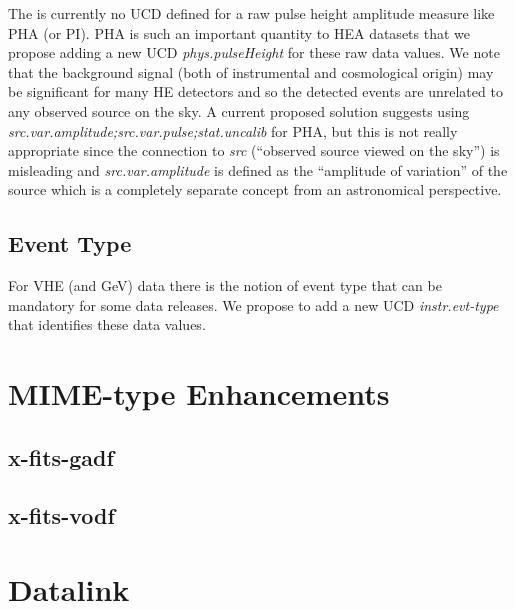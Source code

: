 \documentclass[11pt,a4paper]{ivoa}
\begin{document}
The is currently no UCD defined for a raw pulse height amplitude measure like PHA (or PI). PHA is such an important quantity to HEA datasets that we propose adding a new UCD {\em phys.pulseHeight\/} for these raw data values.  We note that the background signal (both of instrumental and cosmological origin) may be significant for many HE detectors and so the detected events are unrelated to any observed source on the sky.  A current proposed solution suggests using {\em src.var.amplitude;src.var.pulse;stat.uncalib\/} for PHA, but this is not really appropriate since the connection to {\em src\/} (``observed source viewed on the sky'') is misleading and {\em src.var.amplitude\/} is defined as the ``amplitude of variation'' of the source which is a completely separate concept from an astronomical perspective.

\subsection{Event Type}

For VHE (and GeV) data there is the notion of event type that can be mandatory for some data releases.  We propose to add a new UCD {\em instr.evt-type\/} that identifies these data values.


\section{MIME-type Enhancements}\label{sec:mimetypes}

\subsection{x-fits-gadf}

\subsection{x-fits-vodf}

\section{Datalink}\label{sec:datalink}



\pagebreak
\printglossaries



\appendix
\end{document}
